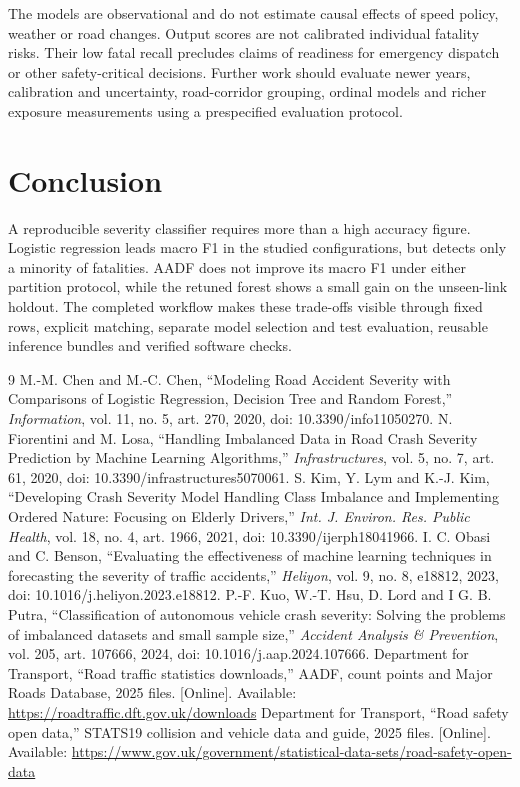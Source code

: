 \documentclass[conference]{IEEEtran}
\begin{document}
The models are observational and do not estimate causal effects of speed policy, weather or road changes. Output scores are not calibrated individual fatality risks. Their low fatal recall precludes claims of readiness for emergency dispatch or other safety-critical decisions. Further work should evaluate newer years, calibration and uncertainty, road-corridor grouping, ordinal models and richer exposure measurements using a prespecified evaluation protocol.

\section{Conclusion}
A reproducible severity classifier requires more than a high accuracy figure. Logistic regression leads macro F1 in the studied configurations, but detects only a minority of fatalities. AADF does not improve its macro F1 under either partition protocol, while the retuned forest shows a small gain on the unseen-link holdout. The completed workflow makes these trade-offs visible through fixed rows, explicit matching, separate model selection and test evaluation, reusable inference bundles and verified software checks.

\begin{thebibliography}{9}
 M.-M. Chen and M.-C. Chen, ``Modeling Road Accident Severity with Comparisons of Logistic Regression, Decision Tree and Random Forest,'' \emph{Information}, vol. 11, no. 5, art. 270, 2020, doi: 10.3390/info11050270.
 N. Fiorentini and M. Losa, ``Handling Imbalanced Data in Road Crash Severity Prediction by Machine Learning Algorithms,'' \emph{Infrastructures}, vol. 5, no. 7, art. 61, 2020, doi: 10.3390/infrastructures5070061.
 S. Kim, Y. Lym and K.-J. Kim, ``Developing Crash Severity Model Handling Class Imbalance and Implementing Ordered Nature: Focusing on Elderly Drivers,'' \emph{Int. J. Environ. Res. Public Health}, vol. 18, no. 4, art. 1966, 2021, doi: 10.3390/ijerph18041966.
 I. C. Obasi and C. Benson, ``Evaluating the effectiveness of machine learning techniques in forecasting the severity of traffic accidents,'' \emph{Heliyon}, vol. 9, no. 8, e18812, 2023, doi: 10.1016/j.heliyon.2023.e18812.
 P.-F. Kuo, W.-T. Hsu, D. Lord and I G. B. Putra, ``Classification of autonomous vehicle crash severity: Solving the problems of imbalanced datasets and small sample size,'' \emph{Accident Analysis \& Prevention}, vol. 205, art. 107666, 2024, doi: 10.1016/j.aap.2024.107666.
 Department for Transport, ``Road traffic statistics downloads,'' AADF, count points and Major Roads Database, 2025 files. [Online]. Available: \url{https://roadtraffic.dft.gov.uk/downloads}
 Department for Transport, ``Road safety open data,'' STATS19 collision and vehicle data and guide, 2025 files. [Online]. Available: \url{https://www.gov.uk/government/statistical-data-sets/road-safety-open-data}
\end{thebibliography}
\end{document}
